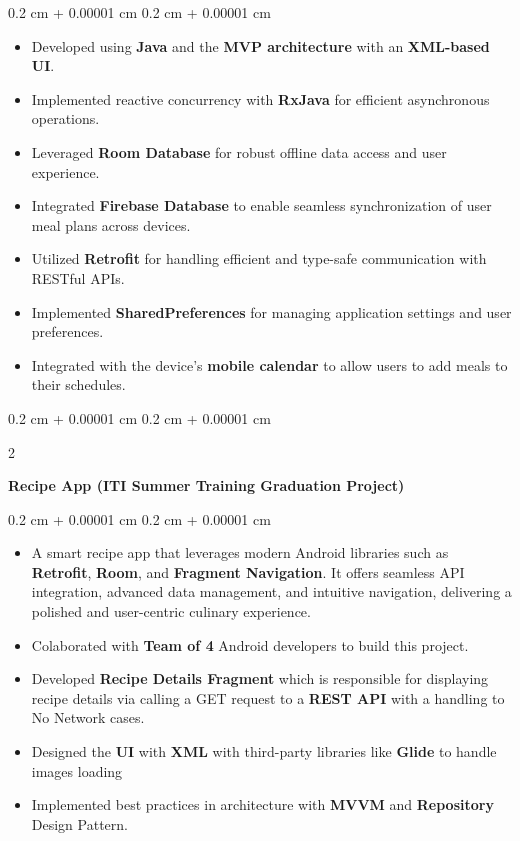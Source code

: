 \documentclass[10pt, letterpaper]{article}
\newenvironment{highlights}{
    \begin{itemize}[
        topsep=0.10 cm,
        parsep=0.10 cm,
        partopsep=0pt,
        itemsep=0pt,
        leftmargin=0.4 cm + 10pt
    ]
}{
    \end{itemize}
} %
\newenvironment{onecolentry}{
    \begin{adjustwidth}{
        0.2 cm + 0.00001 cm
    }{
        0.2 cm + 0.00001 cm
    }
}{
    \end{adjustwidth}
} %
\newenvironment{twocolentry}[2][]{
    \onecolentry
    \def\secondColumn{#2}
    \setcolumnwidth{\fill, 4.5 cm}
    \begin{paracol}{2}
}{
    \switchcolumn \raggedleft \secondColumn
    \end{paracol}
    \endonecolentry
} %
\let\hrefWithoutArrow\href
\renewcommand{\href}[2]{\hrefWithoutArrow{#1}{\ifthenelse{\equal{#2}{}}{ }{#2 }\raisebox{.15ex}{\footnotesize \faExternalLink*}}}
\begin{document}
        \vspace{0.10 cm}
        \begin{onecolentry}
            \begin{highlights}
                \item Developed using \textbf{Java} and the \textbf{MVP architecture} with an \textbf{XML-based UI}.
                \item Implemented reactive concurrency with \textbf{RxJava} for efficient asynchronous operations.
                \item Leveraged \textbf{Room Database} for robust offline data access and user experience.
                \item Integrated \textbf{Firebase Database} to enable seamless synchronization of user meal plans across devices.
                \item Utilized \textbf{Retrofit} for handling efficient and type-safe communication with RESTful APIs.
                \item Implemented \textbf{SharedPreferences} for managing application settings and user preferences.
                \item Integrated with the device's \textbf{mobile calendar} to allow users to add meals to their schedules.
            \end{highlights}
        \end{onecolentry}


        \vspace{0.2 cm}

        \begin{twocolentry}{
            \href{https://github.com/ahmedtelbani/RecipeApp}{Github}
        }
            \textbf{Recipe App (ITI Summer Training Graduation Project)}\end{twocolentry}

        \vspace{0.10 cm}
        \begin{onecolentry}
            \begin{highlights}
                \item A smart recipe app that leverages modern Android libraries such as \textbf{Retrofit}, \textbf{Room}, and \textbf{Fragment Navigation}. It offers seamless API integration, advanced data management, and intuitive navigation, delivering a polished and user-centric culinary experience.
                \item Colaborated with \textbf{Team of 4} Android developers to build this project.
                \item Developed \textbf{Recipe Details Fragment} which is responsible for displaying recipe details via calling a GET request to a \textbf{REST API} with a handling to No Network cases.
                \item Designed the \textbf{UI} with \textbf{XML} with third-party libraries like \textbf{Glide} to handle images loading
                \item Implemented best practices in architecture with \textbf{MVVM} and \textbf{Repository} Design Pattern.
            \end{highlights}
        \end{onecolentry}
\end{document}
